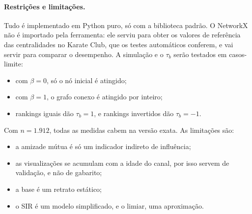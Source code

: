 \paragraph{Restrições e limitações.} Tudo é implementado em Python puro, só com a biblioteca
padrão. O NetworkX não é importado pela ferramenta: ele serviu para obter os valores de referência
das centralidades no Karate Club, que os testes automáticos conferem, e vai servir para comparar o
desempenho. A simulação e o $\tau_b$ serão testados em casos-limite:
\begin{itemize}
  \item com $\beta = 0$, só o nó inicial é atingido;
  \item com $\beta = 1$, o grafo conexo é atingido por inteiro;
  \item rankings iguais dão $\tau_b = 1$, e rankings invertidos dão $\tau_b = -1$.
\end{itemize}
Com $n = 1.912$, todas as medidas cabem na versão exata. As limitações são:
\begin{itemize}
  \item a amizade mútua é só um indicador indireto de influência;
  \item as visualizações se acumulam com a idade do canal, por isso servem de validação, e não de
        gabarito;
  \item a base é um retrato estático;
  \item o SIR é um modelo simplificado, e o limiar, uma aproximação.
\end{itemize}
